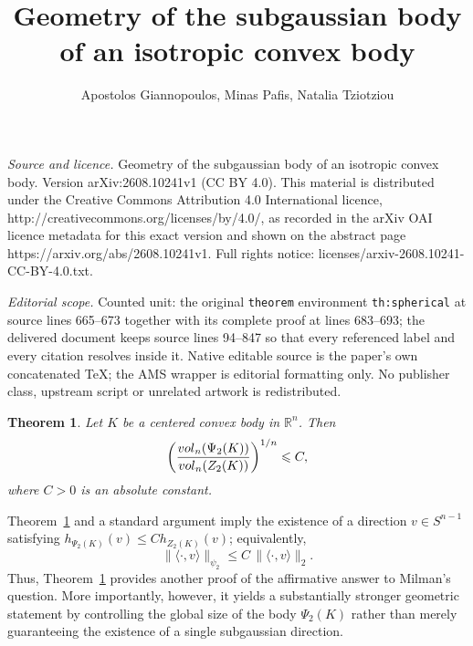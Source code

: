 \documentclass[10pt,a4paper]{amsart}
\newtheorem{theorem}{Theorem}[section]
\numberwithin{equation}{section}
\newcommand{\ls}{\leqslant}
\begin{document}
\title[Geometry of the subgaussian body of an isotropic convex body]{Geometry of the subgaussian body of an isotropic convex body}
\author{Apostolos Giannopoulos, Minas Pafis, Natalia Tziotziou}
\date{}
\maketitle
\noindent\emph{Source and licence.} Geometry of the subgaussian body of an isotropic convex body. Version arXiv:2608.10241v1 (CC BY 4.0). This material is distributed under the Creative Commons Attribution 4.0 International licence, http://creativecommons.org/licenses/by/4.0/, as recorded in the arXiv OAI licence metadata for this exact version and shown on the abstract page https://arxiv.org/abs/2608.10241v1. Full rights notice: licenses/arxiv-2608.10241-CC-BY-4.0.txt.\par\smallskip
\noindent\textit{Editorial scope.} Counted unit: the original \texttt{theorem} environment \texttt{th:spherical} at source lines 665--673 together with its complete proof at lines 683--693; the delivered document keeps source lines 94--847 so that every referenced label and every citation resolves inside it. Native editable source is the paper's own concatenated TeX; the AMS wrapper is editorial formatting only. No publisher class, upstream script or unrelated artwork is redistributed.
\begin{theorem}\label{th:vol-ratio-psi2-body}Let $K$ be a centered convex body in $\mathbb{R}^n$. Then
\[\left(\frac{{\rm vol}_n(\Psi_2(K))}{{\rm vol}_n(Z_2(K))}\right)^{1/n}\ls C,\]
where $C>0$ is an absolute constant.
\end{theorem}

Theorem~\ref{th:vol-ratio-psi2-body} and a standard argument imply the existence of a direction
$v\in S^{n-1}$ satisfying $h_{\Psi_2(K)}(v)\ls  Ch_{Z_2(K)}(v)$; equivalently,
\[\|\langle\cdot,v\rangle\|_{\psi_2}\ls C\,\|\langle\cdot,v\rangle\|_2.\]
Thus, Theorem~\ref{th:vol-ratio-psi2-body} provides another proof of the
affirmative answer to Milman's question. More importantly, however, it yields
a substantially stronger geometric statement by controlling the global size of
the body $\Psi_2(K)$ rather than merely guaranteeing the existence of a single
subgaussian direction.
\end{document}
